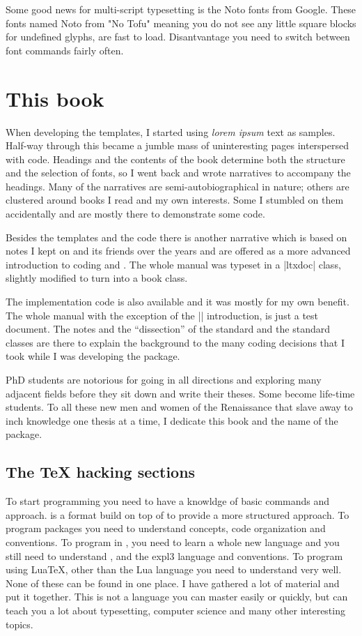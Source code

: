 Some good news for multi-script typesetting is the Noto fonts from Google. These fonts named Noto from "No Tofu" meaning you do not see any little square blocks for undefined glyphs, are fast to load. Disantvantage you need to switch between font commands fairly often.

\section{This book}

When developing the templates, I started using \emph{lorem ipsum} text as samples. Half-way through this
became a jumble mass of uninteresting pages interspersed with code. Headings and the contents of the book
determine both the structure and the selection of fonts, so I went back and wrote narratives  to accompany
the headings. Many of the narratives are semi-autobiographical in nature; others are clustered around books I read and my own interests. Some I stumbled on them accidentally and are mostly there to demonstrate some code.

Besides the templates and the code there is another narrative which is based on notes I kept on \tex and its friends over the years and are offered as a more advanced introduction to coding \latexe and \tex. The whole manual was typeset in a |ltxdoc| class, slightly modified to turn into a book class.

The implementation code is also available and it was mostly for my own benefit. The whole manual with the exception of the |\cxset| introduction, is just a test document. The notes and the “dissection” of the standard \latexe and the standard classes are there to explain the background to the many coding decisions that I took while I was developing the package.

PhD students are notorious for going in all directions and exploring many adjacent fields before they sit down and write their theses. Some become life-time students. To all these new men and women of the Renaissance that slave away to inch knowledge one thesis at a time, I dedicate this book and the name of the package.

\subsection{The TeX hacking sections}

To start programming \tex you need to have a knowldge of \tex basic commands and approach.  is a format build on top of \tex to provide a more structured approach. To program \latexe packages you need to understand \latexe concepts, code organization and conventions. To program in , you need to learn a whole new language and you still need to understand \tex, \latexe and the expl3 language and conventions. To program using LuaTeX, other than the Lua language you need to understand \tex very well.
None of these can be found in one place.  I have gathered a lot of material and put it together. This is not a language you can master easily or quickly, but can teach you a lot about typesetting, computer science and many other interesting topics.



